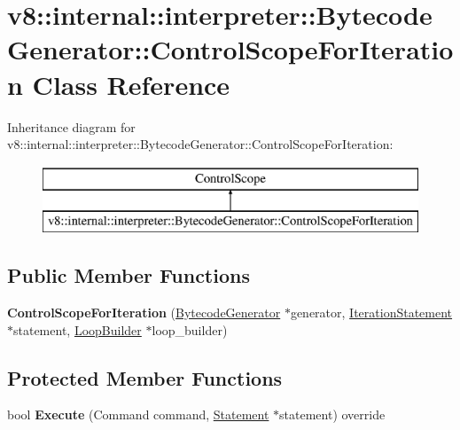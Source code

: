 \hypertarget{classv8_1_1internal_1_1interpreter_1_1_bytecode_generator_1_1_control_scope_for_iteration}{}\section{v8\+:\+:internal\+:\+:interpreter\+:\+:Bytecode\+Generator\+:\+:Control\+Scope\+For\+Iteration Class Reference}
\label{classv8_1_1internal_1_1interpreter_1_1_bytecode_generator_1_1_control_scope_for_iteration}
Inheritance diagram for v8\+:\+:internal\+:\+:interpreter\+:\+:Bytecode\+Generator\+:\+:Control\+Scope\+For\+Iteration\+:\begin{figure}[H]
\begin{center}
\leavevmode
\includegraphics[height=2.000000cm]{classv8_1_1internal_1_1interpreter_1_1_bytecode_generator_1_1_control_scope_for_iteration}
\end{center}
\end{figure}
\subsection*{Public Member Functions}
\begin{DoxyCompactItemize}
\item 
{\bfseries Control\+Scope\+For\+Iteration} (\hyperlink{classv8_1_1internal_1_1interpreter_1_1_bytecode_generator}{Bytecode\+Generator} $\ast$generator, \hyperlink{classv8_1_1internal_1_1_iteration_statement}{Iteration\+Statement} $\ast$statement, \hyperlink{classv8_1_1internal_1_1interpreter_1_1_loop_builder}{Loop\+Builder} $\ast$loop\+\_\+builder)\hypertarget{classv8_1_1internal_1_1interpreter_1_1_bytecode_generator_1_1_control_scope_for_iteration_a56cc5df612ee3df6d1f7e35852f10b46}{}\label{classv8_1_1internal_1_1interpreter_1_1_bytecode_generator_1_1_control_scope_for_iteration_a56cc5df612ee3df6d1f7e35852f10b46}

\end{DoxyCompactItemize}
\subsection*{Protected Member Functions}
\begin{DoxyCompactItemize}
\item 
bool {\bfseries Execute} (Command command, \hyperlink{classv8_1_1internal_1_1_statement}{Statement} $\ast$statement) override\hypertarget{classv8_1_1internal_1_1interpreter_1_1_bytecode_generator_1_1_control_scope_for_iteration_a68b0995c49f248e3fbcd3f03968d42a6}{}\label{classv8_1_1internal_1_1interpreter_1_1_bytecode_generator_1_1_control_scope_for_iteration_a68b0995c49f248e3fbcd3f03968d42a6}

\end{DoxyCompactItemize}
